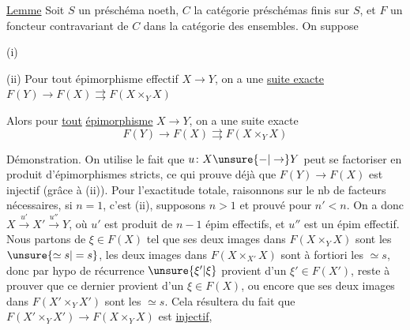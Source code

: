 \uline{Lemme} Soit $S$ un préschéma  noeth, $C$ la catégorie
 préschémas finis sur $S$, et $F$ un foncteur
contravariant de $C$ dans la catégorie des ensembles. On
suppose

(i) 

\deleted{\unsure{*}} (ii) Pour tout épimorphisme effectif $X\to Y$, on a
une \uline{suite exacte} $F(Y)\to F(X)\rightrightarrows F(X\times_Y X)$

Alors pour \uline{tout} \uline{épimorphisme} $X\to Y$, on a
une suite exacte
\[
F(Y)\to F(X)\rightrightarrows F(X\times_Y X)
\]

Démonstration. On utilise le fait que $u\colon X\unsure{-|\to}Y$
peut se factoriser en produit d'épimorphismes
stricts, ce qui prouve déjà que $F(Y)\to F(X)$ est
injectif (grâce à (ii)). Pour l'exactitude totale, raisonnons
sur le nb de facteurs nécessaires, si $n=1$,
c'est (ii), supposons $n>1$ et prouvé pour $n'<n$.
On a donc $X\xrightarrow{u'}X'\xrightarrow{u''}Y$, où $u'$ est produit
de $n-1$ épim effectifs, et $u''$ est un épim
effectif. Nous  partons de $\xi\in F(X)$ tel que
ses deux images dans $F(X\times_Y X)$ sont
les $\unsure{\simeq s|=s}$, les deux images dans
$F(X\times_{X'}X)$ sont à fortiori les $\simeq s$,
donc par hypo de récurrence $\unsure{\xi'|\xi}$ provient
d'un $\xi'\in F(X')$, reste à prouver que ce
dernier provient d'un $\xi\in F(X)$, ou encore que
ses deux images dans $F(X'\times_Y X')$ sont les $\simeq s$. Cela
résultera du fait que $F(X'\times_Y X')\to F(X\times_Y X)$ est \uline{injectif},

